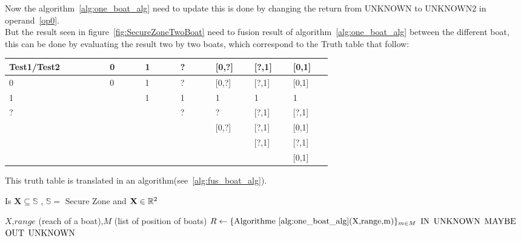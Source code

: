 Now the algorithm~\ref{alg:one_boat_alg} need to update this is done by changing the return from UNKNOWN to UNKNOWN2 in operand~\ref{op0}.\\
But the result seen in figure~\ref{fig:SecureZoneTwoBoat} need to fusion result of algorithm~\ref{alg:one_boat_alg} between the different boat,  this can be done by evaluating the result two by two boats, which correspond to the Truth table that follow:

\begin{center}
\begin{tabular}{|m{0.20\linewidth}|m{0.07\linewidth}|m{0.07\linewidth}|m{0.07\linewidth}|m{0.07\linewidth}|m{0.07\linewidth}|m{0.07\linewidth}|}
\hline
Test1/Test2 & 0 & 1 & ? & [0,?] &  [?,1] & [0,1] \\ \hline
          0 & 0 & 1 & ? & [0,?] &  [?,1] & [0,1]  \\ \hline
          1 &   & 1 & 1 &   1   &    1   &   1  \\ \hline
          ? &   &   & ? &   ?   &  [?,1] & [?,1] \\ \hline
      [0,?] &   &   &   & [0,?] &  [?,1] & [0,1] \\ \hline
      [?,1] &   &   &   &       &  [?,1] & [?,1] \\ \hline
      [0,1] &   &   &   &       &        & [0,1]  \\ \hline   
\end{tabular}
\end{center}

This truth table is translated in an algorithm(see~\ref{alg:fus_boat_alg}).

\begin{algorithm}[H]
\caption{Is $\mathbf{X} \subseteq \mathbb{S}$ , $\mathbb{S} =$ Secure Zone and $\mathbf{X} \in \mathbb{R^{\textnormal{\ensuremath{2}}}}$ }
\label{alg:fus_boat_alg}
\begin{algorithmic}[1]
\REQUIRE $X$,$range $ (reach of a boat),$M$ (list of position of boats)
\STATE $R \leftarrow \{\textnormal{Algorithme$~\ref{alg:one_boat_alg}
$(X,range,m)}\}_{m\in M}$
\RETURN $\textnormal{IN}$
\RETURN $\textnormal{UNKNOWN}$
\RETURN $\textnormal{MAYBE}$
\RETURN $\textnormal{OUT}$
\ELSE
\RETURN $\textnormal{UNKNOWN}$
\ENDIF
\end{algorithmic}
\end{algorithm}

